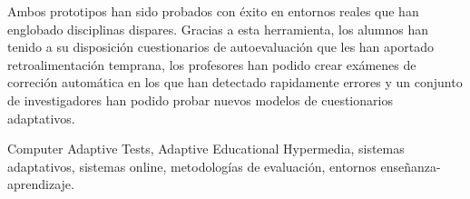 \begin{abstractEs}
Ambos prototipos han sido probados con éxito en entornos reales que han englobado disciplinas dispares. Gracias a esta herramienta, los alumnos han tenido a su disposición cuestionarios de autoevaluación que les han aportado retroalimentación temprana, los profesores han podido crear exámenes de correción automática en los que han detectado rapidamente errores y un conjunto de investigadores han podido probar nuevos modelos de cuestionarios adaptativos.

\end{abstractEs}

\begin{keywordsEs}
Computer Adaptive Tests, Adaptive Educational Hypermedia, sistemas adaptativos, sistemas online, metodologías de evaluación, entornos enseñanza-aprendizaje.
\end{keywordsEs}